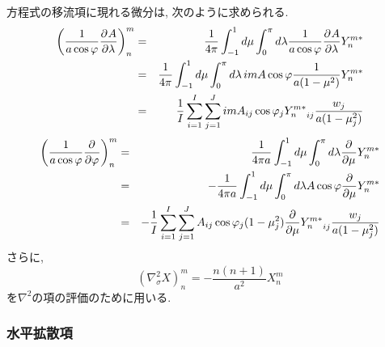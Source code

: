 方程式の移流項に現れる微分は,
次のように求められる.
%
\begin{eqnarray}
  \label{A積分}
  \left( \frac{1}{a\cos\varphi} \DP{A}{\lambda} \right)_n^m 
  & = & \frac{1}{4 \pi} 
        \int_{-1}^{1} d \mu \int_{0}^{\pi} d \lambda 
          \frac{1}{a\cos\varphi} \DP{A}{\lambda} Y_n^{m *} \nonumber\\
  & = & \frac{1}{4 \pi} 
        \int_{-1}^{1} d \mu \int_{0}^{\pi} d \lambda \,
          im A \cos\varphi \frac{1}{a(1-\mu^{2})} Y_n^{m *} \nonumber\\
  & = & \frac{1}{I} \sum_{i=1}^{I} \sum_{j=1}^{J}  
          im A_{ij} \cos\varphi_j
          {Y_n^{m *}}_{ij} \frac{w_j}{a(1-\mu_j^{2})} 
\end{eqnarray}
%
\begin{eqnarray}
  \label{B積分}
  \left( \frac{1}{a\cos\varphi} 
         \DP{}{\varphi} (A\cos\varphi) \right)_n^m 
   & = & \frac{1}{4 \pi a} 
         \int_{-1}^{1} d \mu \int_{0}^{\pi} d \lambda 
           \DP{}{\mu} (A\cos\varphi) Y_n^{m *} \nonumber \\
   & = & - \frac{1}{4 \pi a} 
         \int_{-1}^{1} d \mu \int_{0}^{\pi} d \lambda 
           A \cos\varphi \frac{\partial }{\partial \mu} Y_n^{m *}
           \nonumber \\
  & = & - \frac{1}{I} \sum_{i=1}^{I} \sum_{j=1}^{J}  
          A_{ij}  \cos\varphi_j
          (1-\mu_j^2)  \frac{\partial }{\partial \mu} 
          {Y_n^{m *}}_{ij} \frac{w_j}{a(1-\mu_j^{2})} 
\end{eqnarray}
%
さらに,
\begin{equation}
     \left( \nabla^{2}_{\sigma} X \right)_n^m
       =  - \frac{n(n+1)}{a^{2}} X_n^m
\end{equation}
を$\nabla^2$の項の評価のために用いる.

\subsubsection{水平拡散項}

